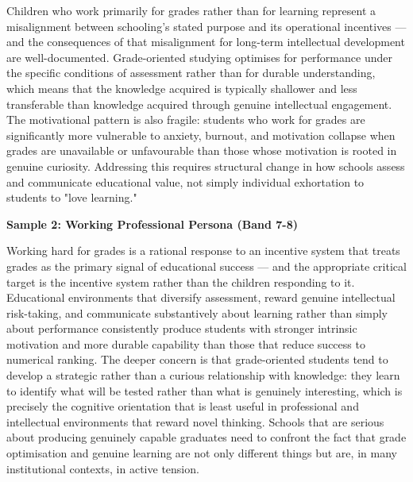 Children who work primarily for grades rather than for learning represent a misalignment between schooling's stated purpose and its operational incentives — and the consequences of that misalignment for long-term intellectual development are well-documented. Grade-oriented studying optimises for performance under the specific conditions of assessment rather than for durable understanding, which means that the knowledge acquired is typically shallower and less transferable than knowledge acquired through genuine intellectual engagement. The motivational pattern is also fragile: students who work for grades are significantly more vulnerable to anxiety, burnout, and motivation collapse when grades are unavailable or unfavourable than those whose motivation is rooted in genuine curiosity. Addressing this requires structural change in how schools assess and communicate educational value, not simply individual exhortation to students to "love learning."

\textbf{Sample 2: Working Professional Persona (Band 7-8)}

Working hard for grades is a rational response to an incentive system that treats grades as the primary signal of educational success — and the appropriate critical target is the incentive system rather than the children responding to it. Educational environments that diversify assessment, reward genuine intellectual risk-taking, and communicate substantively about learning rather than simply about performance consistently produce students with stronger intrinsic motivation and more durable capability than those that reduce success to numerical ranking. The deeper concern is that grade-oriented students tend to develop a strategic rather than a curious relationship with knowledge: they learn to identify what will be tested rather than what is genuinely interesting, which is precisely the cognitive orientation that is least useful in professional and intellectual environments that reward novel thinking. Schools that are serious about producing genuinely capable graduates need to confront the fact that grade optimisation and genuine learning are not only different things but are, in many institutional contexts, in active tension.

\separator


